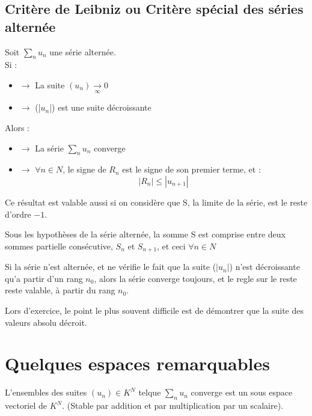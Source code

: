 \subsection{Critère de Leibniz ou Critère spécial des séries alternée}
\begin{enon}
Soit $\underset{n}\sum u_n$ une série alternée.\\
Si : 
\begin{itemize}
 \item{$\rightarrow$} La suite $(u_n) \underset{\infty}\rightarrow 0$
 \item{$\rightarrow$} (|$u_n$|) est une suite décroissante
\end{itemize}
Alors : 
\begin{itemize}
  \item{$\rightarrow$} La série $\underset{n} \sum u_n$ converge
 \item{$\rightarrow$} $\forall n \in N$, le signe de $R_n$ est le signe de son premier terme, et : 
$$|R_n|\leq |u_{n+1}|$$
\end{itemize}
Ce résultat est valable aussi si on considère que S, la limite de la série, est le reste d'ordre $-1$.
\end{enon}
\begin{prop}
 Sous les hypothèses de la série alternée, la somme S est comprise entre deux sommes partielle consécutive, $S_n$ et $S_{n+1}$, et ceci $\forall n \in N$
\end{prop}
\begin{prop}
Si la série n'est alternée, et ne vérifie le fait que la suite ($|u_n|$) n'est décroissante qu'a partir d'un rang $n_0$, alors la série converge toujours, et le regle sur le reste reste valable, à partir du rang $n_0$.
\end{prop}
Lors d'exercice, le point le plus souvent difficile est de démontrer que la suite des valeurs absolu décroit.
\section{Quelques espaces remarquables}
\begin{prop}
L'ensembles des suites $(u_n) \in K^{N}$ telque $\underset{n}\sum u_n$ converge est un sous espace vectoriel de $K^N$. (Stable par addition et par multiplication par un scalaire). 
\end{prop}
